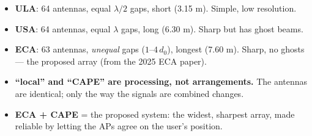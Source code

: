 \documentclass[11pt]{article}
\begin{document}
\begin{keybox}
\begin{itemize}[leftmargin=1.3em,itemsep=2pt]
\item \textbf{ULA}: 64 antennas, equal $\lambda/2$ gaps, short (3.15 m). Simple, low resolution.
\item \textbf{USA}: 64 antennas, equal $\lambda$ gaps, long (6.30 m). Sharp but has ghost beams.
\item \textbf{ECA}: 63 antennas, \emph{unequal} gaps ($1$--$4\,d_0$), longest (7.60 m). Sharp,
      no ghosts --- the proposed array (from the 2025 ECA paper).
\item \textbf{``local'' and ``CAPE'' are processing, not arrangements.} The antennas are identical;
      only the way the signals are combined changes.
\item \textbf{ECA + CAPE} = the proposed system: the widest, sharpest array, made reliable by
      letting the APs agree on the user's position.
\end{itemize}
\end{keybox}
\end{document}
